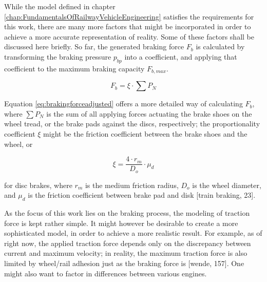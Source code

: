 \par\noindent
While the model defined in chapter \ref{chap:FundamentalsOfRailwayVehicleEngineering} satisfies the requirements for this work, there are many more factors that might be incorporated in order to achieve a more accurate representation of reality. Some of these factors shall be discussed here briefly. So far, the generated braking force $F_{b}$ is calculated by transforming the braking pressure $p_{bp}$ into a coefficient, and applying that coefficient to the maximum braking capacity $F_{b,max}$.

\begin{equation}
\label{eq:brakingforceadjusted}
F_{b} = \xi \cdot \sum P_{N}
\end{equation}

\noindent
Equation \ref{eq:brakingforceadjusted} offers a more detailed way of calculating $F_{b}$, where $\sum P_{N}$ is the sum of all applying forces actuating the brake shoes on the wheel tread, or the brake pads against the discs, respectively; the proportionality coefficient $\xi$ might be the friction coefficient between the brake shoes and the wheel, or

\begin{equation}
\label{eq:xi}
\xi = \frac{4 \cdot r_{m}}{D_{o}} \cdot \mu_{d}
\end{equation}

\noindent
for disc brakes, where $r_{m}$ is the medium friction radius, $D_{o}$ is the wheel diameter, and $\mu_{d}$ is the friction coefficient between brake pad and disk [train braking, 23].
\par
As the focus of this work lies on the braking process, the modeling of traction force is kept rather simple. It might however be desirable to create a more sophisticated model, in order to achieve a more realistic result. For example, as of right now, the applied traction force depends only on the discrepancy between current and maximum velocity; in reality, the maximum traction force is also limited by wheel/rail adhesion just as the braking force is [wende, 157]. One might also want to factor in differences between various engines.